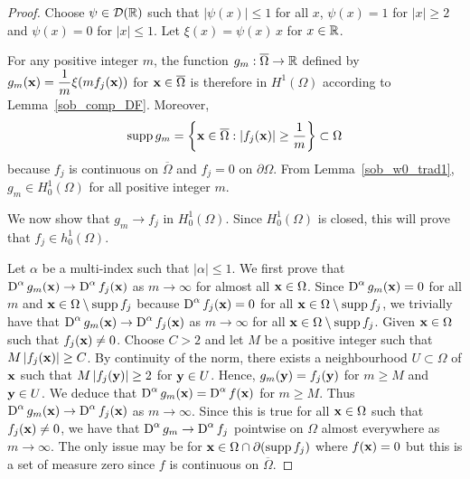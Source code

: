 \begin{proof}
\stage{$\mathbf{\Leftarrow}$}
Choose $\displaystyle \psi \in \mathcal{D}(\mathbb{R})$ such that
$|\psi(x)|\leq 1$ for all $x$, $\psi(x) = 1$ for $|x|\geq 2$ and
$\psi(x) = 0$ for $|x|\leq 1$.  Let
$\xi(x) = \psi(x)\,x$ for $x \in \mathbb{R}$.

For any positive integer $m$, the function
$g_m:\overline{\Omega}\rightarrow \mathbb{R}$ defined
by $\displaystyle g_m(\mathbf{x}) = \frac{1}{m}\xi(mf_j(\mathbf{x}))$ for
$\mathbf{x}\in \overline{\Omega}$ is therefore in $\displaystyle H^1(\Omega)$
according to Lemma~\ref{sob_comp_DF}.  Moreover,
\[
\operatorname{supp} g_m = \left\{ \mathbf{x} \in \overline{\Omega} : |f_j(\mathbf{x})| \geq \frac{1}{m}
\right\} \subset \Omega
\]
because $f_j$ is continuous on $\overline{\Omega}$ and $f_j = 0$ on
$\partial \Omega$.  From Lemma~\ref{sob_w0_trad1},
$\displaystyle g_m \in H^1_0(\Omega)$ for all positive integer $m$.

We now show that $g_m \rightarrow f_j$ in $\displaystyle H^1_0(\Omega)$.
Since $\displaystyle H^1_0(\Omega)$ is closed, this will prove that
$\displaystyle f_j \in h^1_0(\Omega)$.

Let $\alpha$ be a multi-index such that $|\alpha|\leq 1$.  We first prove
that $\displaystyle \operatorname{D}^\alpha g_m(\mathbf{x}) \rightarrow
\operatorname{D}^\alpha f_j(\mathbf{x})$ as $m\rightarrow \infty$ for almost all
$\mathbf{x}\in \Omega$.
Since $\displaystyle \operatorname{D}^\alpha g_m(\mathbf{x})=0$ for all $m$ and
$\mathbf{x} \in \Omega \setminus \operatorname{supp} f_j$ because
$\displaystyle \operatorname{D}^\alpha f_j(\mathbf{x})=0$ for all
$\mathbf{x} \in \Omega \setminus \operatorname{supp} f_j$,
we trivially have that
$\displaystyle \operatorname{D}^\alpha g_m(\mathbf{x}) \rightarrow \operatorname{D}^\alpha f_j(\mathbf{x})$
as $m\rightarrow \infty$ for all $\mathbf{x} \in \Omega \setminus \operatorname{supp} f_j$.
Given $\mathbf{x} \in \Omega$ such that $f_j(\mathbf{x}) \neq 0$.
Choose $\displaystyle C> 2$ and let $M$ be a positive integer such that
$\displaystyle M \left|f_j(\mathbf{x})\right|\geq C$.  By continuity of the
norm, there exists a neighbourhood $U\subset \Omega$ of $\mathbf{x}$ such that 
$\displaystyle M \left|f_j(\mathbf{y})\right|\geq 2$ for $\mathbf{y} \in U$.
Hence, $g_m(\mathbf{y}) = f_j(\mathbf{y})$ for $m\geq M$ and $\mathbf{y} \in U$.
We deduce that
$\displaystyle \operatorname{D}^\alpha g_m(\mathbf{x}) = \operatorname{D}^\alpha f(\mathbf{x})$
for $m\geq M$. 
Thus $\displaystyle \operatorname{D}^\alpha g_m(\mathbf{x}) \rightarrow
\operatorname{D}^\alpha f_j(\mathbf{x})$ as
$m\rightarrow \infty$.  Since this is true for all $\mathbf{x} \in \Omega$ such
that $f_j(\mathbf{x}) \neq 0$, we have that
$\displaystyle \operatorname{D}^\alpha g_m \rightarrow \operatorname{D}^\alpha f_j$ pointwise
on $\Omega$ almost everywhere as $m\rightarrow \infty$.  The only
issue may be for $\mathbf{x} \in \Omega \cap \partial (\operatorname{supp} f_j)$ where
$f(\mathbf{x}) = 0$ but this is a set of measure zero since $f$ is
continuous on $\overline{\Omega}$.


\end{proof}
